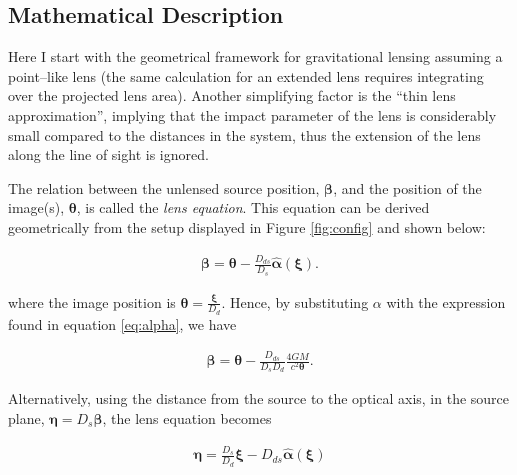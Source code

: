 \documentclass[paper=a4, fontsize=11pt]{scrartcl} %
\numberwithin{equation}{section} %
\numberwithin{figure}{section} %
\numberwithin{table}{section} %
\begin{document}
\subsection{Mathematical Description}
Here I start with the geometrical framework for gravitational lensing assuming a point--like lens (the same calculation for an extended lens requires integrating over the projected lens area). Another simplifying factor is the ``thin lens approximation'', implying that the impact parameter of the lens is considerably small compared to the distances in the system, thus the extension of the lens along the line of sight is ignored.

The relation between the unlensed source position, $\boldsymbol \beta$, and the position of the image(s), $\boldsymbol \theta$, is called the \emph{lens equation}. This equation can be derived geometrically from the setup displayed in Figure \ref{fig:config} and shown below:

\begin{eqnarray}
\label{eq:lens_eq_angle}
\boldsymbol \beta = \boldsymbol \theta - \frac{D_{ds}}{D_s} \hat{\boldsymbol \alpha}(\boldsymbol \xi).
\end{eqnarray}

 where the image position is $\boldsymbol \theta = \frac{\boldsymbol \xi}{D_{d}}$. Hence, by substituting $\alpha$ with the expression found in equation \ref{eq:alpha}, we have

 \begin{eqnarray}
 \label{eq:lens_equation}
 \boldsymbol \beta = \boldsymbol \theta - \frac{D_{ds}}{D_s D_d} \frac{4GM}{c^2 \boldsymbol \theta}.
 \end{eqnarray}

 Alternatively, using the distance from the source to the optical axis, in the source plane,  $\boldsymbol \eta = D_{s} \boldsymbol \beta$, the lens equation becomes

\begin{eqnarray}
\label{eq:lens_eq_distance}
\boldsymbol \eta = \frac{D_s}{D_d}\boldsymbol \xi - D_{ds}\hat{\boldsymbol \alpha}(\boldsymbol \xi)
\end{eqnarray}
\end{document}
